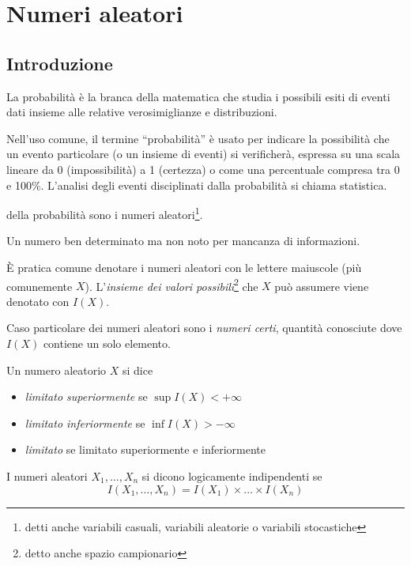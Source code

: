 \chapter{Numeri aleatori}
\section{Introduzione} %
La probabilità è la branca della matematica che studia i possibili esiti di eventi dati insieme alle relative verosimiglianze e distribuzioni.

Nell'uso comune, il termine ``probabilità'' è usato per indicare la possibilità che un evento particolare (o un insieme di eventi) si verificherà, espressa su una scala lineare da 0 (impossibilità) a 1 (certezza) o come una percentuale compresa tra 0 e 100\%.
L'analisi degli eventi disciplinati dalla probabilità si chiama statistica.

 della probabilità sono i numeri aleatori\footnote{detti anche variabili casuali, variabili aleatorie o variabili stocastiche}.

\begin{definition}
  Un numero ben determinato ma non noto per mancanza di informazioni.
\end{definition}
È pratica comune denotare i numeri aleatori con le lettere maiuscole (più comunemente $X$).
L'\emph{insieme dei valori possibili}\footnote{detto anche spazio campionario} che $X$ può assumere viene denotato con $I(X)$.

Caso particolare dei numeri aleatori sono i \emph{numeri certi}, quantità conosciute dove $I(X)$ contiene un solo elemento.

\begin{definition}
  Un numero aleatorio $X$ si dice
  \begin{itemize}
  \item \emph{limitato superiormente} se \( \sup I(X) < + \infty \)
  \item \emph{limitato inferiormente} se \( \inf I(X) > - \infty \)
  \item \emph{limitato} se limitato superiormente e inferiormente
  \end{itemize}
\end{definition}

\begin{definition}
  I numeri aleatori $X_1, \ldots, X_n$ si dicono logicamente indipendenti se
  \[ I(X_1, \ldots, X_n) = I(X_1) \times \ldots \times I(X_n) \]
\end{definition}

